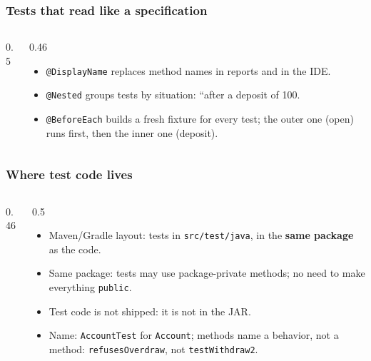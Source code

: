 \documentclass[aspectratio=169,10pt,compress]{beamer}
\begin{document}
\begin{frame}[t,fragile] \frametitle{Tests that read like a specification}
  \begin{columns}[T]
    \begin{column}{0.5\textwidth}
    \end{column}
    \begin{column}{0.46\textwidth}
      \begin{itemize}\small
        \item \texttt{@DisplayName} replaces method names in reports and in the IDE.
        \item \texttt{@Nested} groups tests by situation: ``after a deposit of 100.
        \item \texttt{@BeforeEach} builds a fresh fixture for every test; the outer one (open) runs first, then the inner one (deposit).
      \end{itemize}
    \end{column}
  \end{columns}
\end{frame}




\begin{frame}[t,fragile] \frametitle{Where test code lives}
  \begin{columns}[T]
    \begin{column}{0.46\textwidth}
      \begin{center}
      \end{center}
    \end{column}
    \begin{column}{0.5\textwidth}
      \begin{itemize}\small
        \item Maven/Gradle layout: tests in \texttt{src/test/java}, in the \textbf{same package} as the code.
        \item Same package: tests may use package-private methods; no need to make everything \texttt{public}.
        \item Test code is not shipped: it is not in the JAR.
        \item Name: \texttt{AccountTest} for \texttt{Account}; methods name a behavior, not a method:
              \texttt{refusesOverdraw}, not \texttt{testWithdraw2}.
      \end{itemize}
    \end{column}
  \end{columns}
\end{frame}
\end{document}
